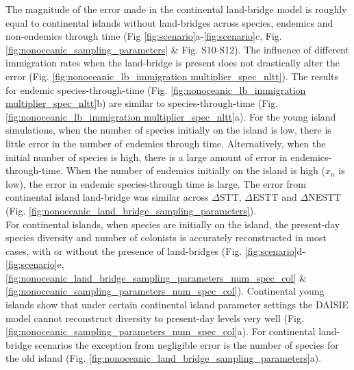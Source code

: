 \documentclass{article}
\begin{document}
The magnitude of the error made in the continental land-bridge model is roughly equal to continental islands without land-bridges across species, endemics and non-endemics through time (Fig \ref{fig:scenario}a-\ref{fig:scenario}c, Fig. \ref{fig:nonoceanic_sampling_parameters} \& Fig. S10-S12). The influence of different immigration rates when the land-bridge is present does not drastically alter the error (Fig. \ref{fig:nonoceanic_lb_immigration multiplier_spec_nltt}). The results for endemic species-through-time (Fig. \ref{fig:nonoceanic_lb_immigration multiplier_spec_nltt}b) are similar to species-through-time (Fig. \ref{fig:nonoceanic_lb_immigration multiplier_spec_nltt}a). For the young island simulations, when the number of species initially on the island is low, there is little error in the number of endemics through time. Alternatively, when the initial number of species is high, there is a large amount of error in endemics-through-time. When the number of endemics initially on the island is high ($x_n$ is low), the error in endemic species-through time is large. The error from continental island land-bridge was similar across $\Delta$STT, $\Delta$ESTT and $\Delta$NESTT (Fig. \ref{fig:nonoceanic_land_bridge_sampling_parameters}). \\

For continental islands, when species are initially on the island, the present-day species diversity and number of colonists is accurately reconstructed in most cases, with or without the presence of land-bridges (Fig. \ref{fig:scenario}d-\ref{fig:scenario}e, \ref{fig:nonoceanic_land_bridge_sampling_parameters_num_spec_col} \& \ref{fig:nonoceanic_sampling_parameters_num_spec_col}). Continental young islands show that under certain continental island parameter settings the DAISIE model cannot reconstruct diversity to present-day levels very well (Fig. \ref{fig:nonoceanic_sampling_parameters_num_spec_col}a). For continental land-bridge scenarios the exception from negligible error is the number of species for the old island (Fig. \ref{fig:nonoceanic_land_bridge_sampling_parameters}a).

\clearpage
\end{document}
